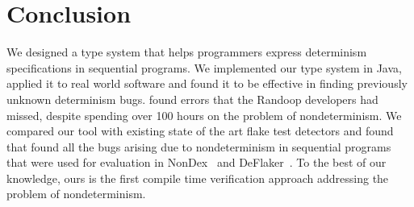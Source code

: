 \section{Conclusion}\label{sec:conclusion}

We designed a type system that helps programmers express determinism specifications
in sequential programs. 
We implemented our type system in Java, applied it to real world 
software and found it to be effective in finding previously unknown determinism bugs. 
\TheDeterminismChecker found errors that the
Randoop developers had missed, despite spending over 100 hours on the
problem of nondeterminism. We compared our tool with existing state of the art flake test detectors
and found that \theDeterminismChecker found all the bugs arising due to nondeterminism
in sequential programs that were used for evaluation in NonDex~\cite{nondex} and DeFlaker~\cite{deflaker}.
To the best of our knowledge, ours is the
first compile time verification approach addressing the problem of nondeterminism.
